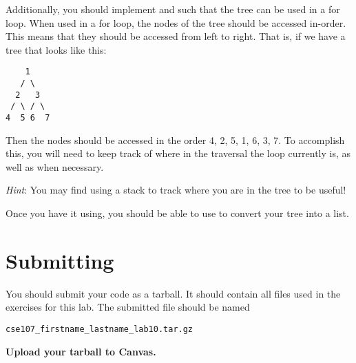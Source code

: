 \documentclass[11pt]{cselabheader}
\begin{document}
\begin{ex}[tree.py]
    Additionally, you should implement  and
     such that the tree can be used in a for loop.
    When used in a for loop, the nodes of the tree should be accessed in-order.
    This means that they should be accessed from left to right. That is, if we
    have a tree that looks like this:

\begin{verbatim}
    1
   / \
  2   3
 / \ / \
4  5 6  7
\end{verbatim}

    Then the nodes should be accessed in the order 4, 2, 5, 1, 6, 3, 7. To
    accomplish this, you will need to keep track of where in the traversal the
    loop currently is, as well as \pythoninline{raise StopIteration} when
    necessary.

    \emph{Hint}: You may find using a stack to track where you are in the tree
    to be useful!

    Once you have it using, you should be able to use  to
    convert your tree into a list.
\end{ex}

\pagebreak
\section{Submitting}
You should submit your code as a tarball. It should contain all files
used in the exercises for this lab. The submitted file should be named
\begin{center}
  \texttt{cse107\_firstname\_lastname\_lab10.tar.gz}
\end{center}

\begin{center}
  \textbf{Upload your tarball to Canvas.}
\end{center}

\listoftheorems
\end{document}
